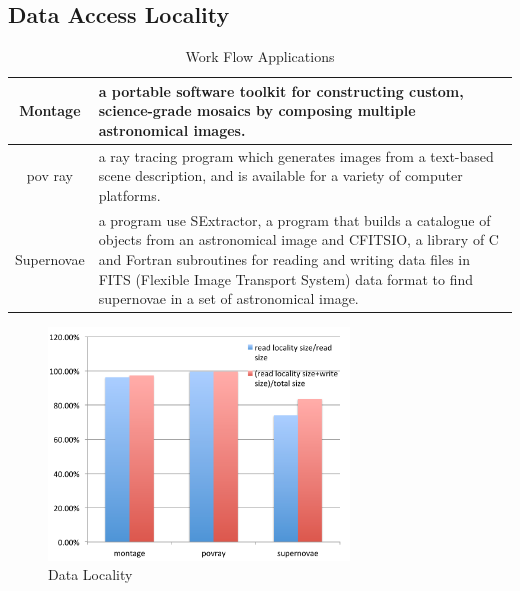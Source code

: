 \subsection{Data Access Locality}

\begin{table}
\centering
\begin{tabular}{|c|p{150pt}|}
\hline
Montage		&		a portable software toolkit for constructing custom, science-grade 
mosaics by composing multiple astronomical images\cite{montage}.\\\hline
pov ray		&		a ray tracing program which generates images from a text-based scene description, and is
available for a variety of computer platforms\cite{povray}.\\\hline
Supernovae	&	a program use SExtractor\cite{SExtractor}, a program that builds a catalogue of objects
from an astronomical image and CFITSIO\cite{fitsio},  a library of C and Fortran subroutines for
reading and writing data files in FITS (Flexible Image Transport System) data format to find supernovae in a set of
astronomical image.\\
\hline
\end{tabular}
\caption{Work Flow Applications}
\label{background:work flow applications}
\end{table}

\begin{figure}
\centering
\includegraphics[width=8cm]{img/data_locality.pdf}
\caption{Data Locality}
\label{background:data locality}
\end{figure}

